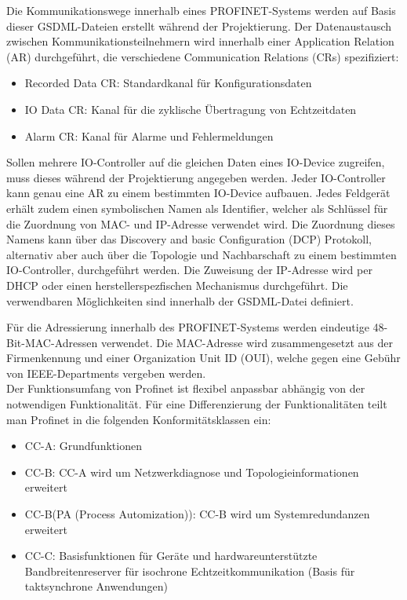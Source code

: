 Die Kommunikationswege innerhalb eines PROFINET-Systems werden auf Basis dieser GSDML-Dateien erstellt während der Projektierung. Der Datenaustausch zwischen Kommunikationsteilnehmern wird innerhalb einer Application Relation (AR) durchgeführt, die verschiedene Communication Relations (CRs) spezifiziert:
\begin{itemize}
\item Recorded Data CR: Standardkanal für Konfigurationsdaten
\item IO Data CR: Kanal für die zyklische Übertragung von Echtzeitdaten
\item Alarm CR: Kanal für Alarme und Fehlermeldungen
\end{itemize}

Sollen mehrere IO-Controller auf die gleichen Daten eines IO-Device zugreifen, muss dieses während der Projektierung angegeben werden. Jeder IO-Controller kann genau eine AR zu einem bestimmten IO-Device aufbauen. Jedes Feldgerät erhält zudem einen symbolischen Namen als Identifier, welcher als Schlüssel für die Zuordnung von MAC- und IP-Adresse verwendet wird. Die Zuordnung dieses Namens kann über das \glqq Discovery and basic Configuration (DCP)\grqq{} Protokoll, alternativ aber auch über die Topologie und Nachbarschaft zu einem bestimmten IO-Controller, durchgeführt werden. Die Zuweisung der IP-Adresse wird per DHCP oder einen herstellerspezfischen Mechanismus durchgeführt. Die verwendbaren Möglichkeiten sind innerhalb der GSDML-Datei definiert.

Für die Adressierung innerhalb des PROFINET-Systems werden eindeutige 48-Bit-MAC-Adressen verwendet. Die MAC-Adresse wird zusammengesetzt aus der Firmenkennung und einer Organization Unit ID (OUI), welche gegen eine Gebühr von IEEE-Departments vergeben werden.\\


Der Funktionsumfang von Profinet ist flexibel anpassbar abhängig von der notwendigen Funktionalität. Für eine Differenzierung der Funktionalitäten teilt man Profinet in die folgenden Konformitätsklassen ein:
\begin{itemize}
\item CC-A: Grundfunktionen
\item CC-B: CC-A wird um Netzwerkdiagnose und Topologieinformationen erweitert
\item CC-B(PA (Process Automization)): CC-B wird um Systemredundanzen erweitert
\item CC-C: Basisfunktionen für Geräte und hardwareunterstützte Bandbreitenreserver für isochrone Echtzeitkommunikation (Basis für taktsynchrone Anwendungen)
\end{itemize}


